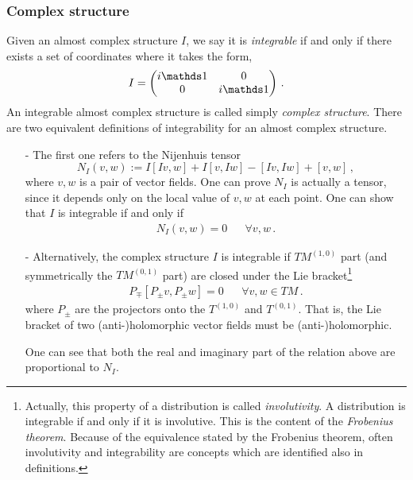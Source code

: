 \documentclass[debug]{phd}
\begin{document}
				\subsubsection{Complex structure}
						Given an almost complex structure $I$, we say it is \emph{integrable} if and only if there exists a set of coordinates where it takes the form,
								\begin{equation}
								\label{diagI}
									I =	\begin{pmatrix}
											i \id	&		0		\\
												0		&	i \id	\\
										\end{pmatrix} \, .
								\end{equation}
						An integrable almost complex structure is called simply \emph{complex structure}.
						There are two equivalent definitions of integrability for an almost complex structure. 							%
								\begin{itemize}
									\item[-]	The first one refers to the Nijenhuis tensor
													\begin{equation}\label{nijten}
														N_I(v,w) := I \left[ I v, w \right] + I \left[ v, I w \right] - \left[ I v, I w \right] + \left[ v, w \right]\, ,
													\end{equation}
									where $v, w$ is a pair of vector fields.
											One can prove $N_I$ is actually a tensor, since it depends only on the local value of $v, w$ at each point.
											One can show that $I$ is integrable if and only if
													\begin{align*}
														& & N_I(v,w) = 0 & & \forall v, w\, .& &
													\end{align*}
									\item[-]	Alternatively, the complex structure $I$ is integrable if $TM^{(1,0)}$ part (and symmetrically the $TM^{(0,1)}$ part) are closed under the Lie bracket\footnote{
												Actually, this property of a distribution is called \emph{involutivity}. 
												A distribution is integrable if and only if it is involutive. 
												This is the content of the \emph{Frobenius theorem}.
												Because of the equivalence stated by the Frobenius theorem, often involutivity and integrability are concepts which are identified also in definitions.%
													}
													\begin{align*}
														& &	P_{\mp} \left[ P_{\pm} v, P_{\pm} w \right] = 0	& &	\forall v,w \in TM \, .	& &
													\end{align*}
												where $P_\pm$ are the projectors onto the $T^{(1,0)}$ and $T^{(0,1)}$. 
												That is, the Lie bracket of two (anti-)holomorphic vector fields must be (anti-)holomorphic.
											
												One can see that both the real and imaginary part of the relation above are proportional to $N_I$.
								\end{itemize}
\end{document}
